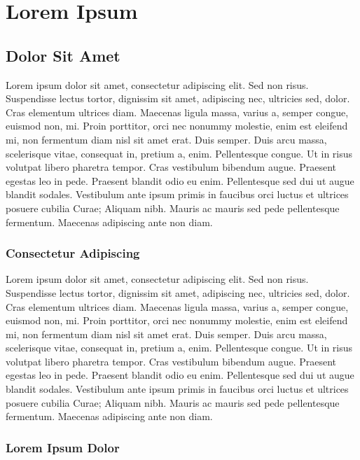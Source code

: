 \chapter{Lorem Ipsum}
\section{Dolor Sit Amet}
Lorem ipsum dolor sit amet, consectetur adipiscing elit. Sed non risus. Suspendisse lectus tortor, dignissim sit amet, adipiscing nec, ultricies sed, dolor. Cras elementum ultrices diam. Maecenas ligula massa, varius a, semper congue, euismod non, mi. Proin porttitor, orci nec nonummy molestie, enim est eleifend mi, non fermentum diam nisl sit amet erat. Duis semper. Duis arcu massa, scelerisque vitae, consequat in, pretium a, enim. Pellentesque congue. Ut in risus volutpat libero pharetra tempor. Cras vestibulum bibendum augue. Praesent egestas leo in pede. Praesent blandit odio eu enim. Pellentesque sed dui ut augue blandit sodales. Vestibulum ante ipsum primis in faucibus orci luctus et ultrices posuere cubilia Curae; Aliquam nibh. Mauris ac mauris sed pede pellentesque fermentum. Maecenas adipiscing ante non diam.
\subsection{Consectetur Adipiscing}
Lorem ipsum dolor sit amet, consectetur adipiscing elit. Sed non risus. Suspendisse lectus tortor, dignissim sit amet, adipiscing nec, ultricies sed, dolor. Cras elementum ultrices diam. Maecenas ligula massa, varius a, semper congue, euismod non, mi. Proin porttitor, orci nec nonummy molestie, enim est eleifend mi, non fermentum diam nisl sit amet erat. Duis semper. Duis arcu massa, scelerisque vitae, consequat in, pretium a, enim. Pellentesque congue. Ut in risus volutpat libero pharetra tempor. Cras vestibulum bibendum augue. Praesent egestas leo in pede. Praesent blandit odio eu enim. Pellentesque sed dui ut augue blandit sodales. Vestibulum ante ipsum primis in faucibus orci luctus et ultrices posuere cubilia Curae; Aliquam nibh. Mauris ac mauris sed pede pellentesque fermentum. Maecenas adipiscing ante non diam.

\subsection{Lorem Ipsum Dolor}

